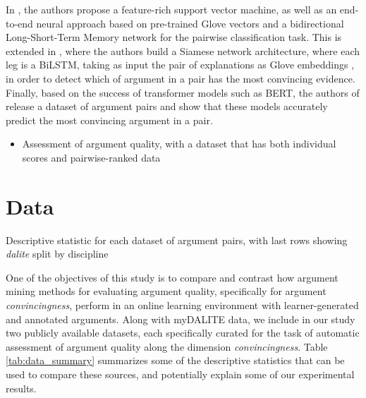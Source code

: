 \documentclass[runningheads]{llncs}
\begin{document}
In \cite{habernal_which_2016}, the authors propose a feature-rich support 
vector machine, as well as an end-to-end neural approach based on pre-trained 
Glove vectors and a bidirectional Long-Short-Term Memory network for the 
pairwise classification task. This is extended in \cite{gleize_are_2019}, where 
the authors build a Siamese network architecture, where each leg is a BiLSTM, 
taking as input the pair of explanations as Glove embeddings 
\cite{pennington_glove:_2014}, in order to detect which of argument in a pair 
has the most convincing evidence. Finally, based on the success of transformer 
models such as BERT\cite{devlin_bert_2018}, the authors of 
\cite{toledo_automatic_2019} 
release a dataset of argument pairs and show that these models accurately 
predict the most convincing argument in a pair.



\begin{itemize}

	\item \cite{toledo_automatic_2019} Assessment of argument quality, with a 
	dataset that has both individual scores 
	and pairwise-ranked data 
	
\end{itemize}
  
\section{Data}

\begin{table}
	\caption{Descriptive statistic for each dataset of argument pairs, with 
		last rows showing \textit{dalite} split by discipline}
	
	\label{tab:data_summary}
\end{table}

One of the objectives of this study is to compare and contrast how argument 
mining methods for evaluating argument quality, specifically for argument 
\textit{convincingness}, perform in an online learning environment with 
learner-generated and annotated arguments. Along with myDALITE data, we include 
in our study two publicly 
available datasets, each specifically curated for the task of automatic 
assessment of argument quality along the dimension \textit{convincingness}. 
Table \ref{tab:data_summary} summarizes some of the descriptive statistics that 
can be used to compare these sources, and potentially explain some of our 
experimental results.
\end{document}
